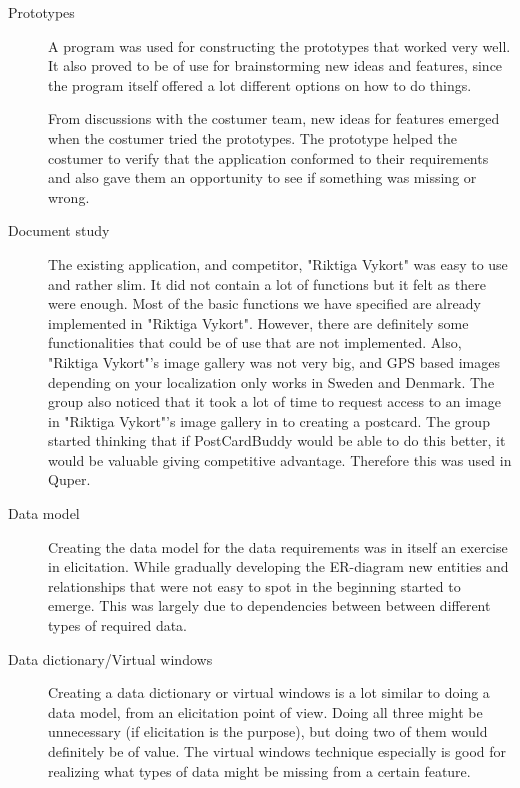 \documentclass[10pt,a4paper]{article}
\begin{document}
\begin{description}
\item[Prototypes] A program was used for constructing the prototypes that worked very well. It also proved to be of use for brainstorming new ideas and features, since the program itself offered a lot different options on how to do things. 

From discussions with the costumer team, new ideas for features emerged when the costumer tried the prototypes. The prototype helped the costumer to verify that the application conformed to their requirements and also gave them an opportunity to see if something was missing or wrong.

\item[Document study] The existing application, and competitor, "Riktiga Vykort" was easy to use and rather slim. It did not contain a lot of functions but it felt as there were enough. Most of the basic functions we have specified are already implemented in "Riktiga Vykort". However, there are definitely some functionalities that could be of use that are not implemented. Also, "Riktiga Vykort"'s image gallery was not very big, and GPS based images depending on your localization only works in Sweden and Denmark. The group also noticed that it took a lot of time to request access to an image in "Riktiga Vykort"'s image gallery in to creating a postcard. The group started thinking that if PostCardBuddy would be able to do this better, it would be valuable giving competitive advantage. Therefore this was used in Quper.

\item[Data model] Creating the data model for the data requirements was in itself an exercise in elicitation. While gradually developing the ER-diagram new entities and relationships that were not easy to spot in the beginning started to emerge. This was largely due to dependencies between between different types of required data.

\item[Data dictionary/Virtual windows] Creating a data dictionary or virtual windows is a lot similar to doing a data model, from an elicitation point of view. Doing all three might be unnecessary (if elicitation is the purpose), but doing two of them would definitely be of value. The virtual windows technique especially is good for realizing what types of data might be missing from a certain feature.
\end{description}
\end{document}

